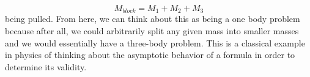 $$M_{block}=M_1+M_2+M_3$$ being pulled. From here, we can think about this as being a one body problem because after all, we could arbitrarily split any given mass into smaller masses and we would essentially have a three-body problem. This is a classical example in physics of thinking about the asymptotic behavior of a formula in order to determine its validity.